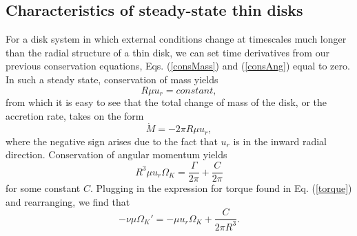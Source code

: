 \documentclass[aps,pra,twocolumn]{revtex4-1}
\begin{document}
\subsection{\label{section 2.2} Characteristics of steady-state thin disks}
For a disk system in which external conditions change at timescales much longer than the radial structure of a thin disk, we can set time derivatives from our previous conservation equations, Eqs. (\ref{consMass}) and (\ref{consAng}) equal to zero.  In such a steady state, conservation of mass yields
\begin{equation}
R\mu u_r = constant, \nonumber
\end{equation}
from which it is easy to see that the total change of mass of the disk, or the accretion rate, takes on the form
\begin{equation}
\dot{M} = -2\pi R \mu u_r, \label{modifiedMass1}
\end{equation}
where the negative sign arises due to the fact that $u_r$ is in the inward radial direction.  Conservation of angular momentum yields
\begin{equation}
R^3 \mu u_r \Omega_K = \frac{\Gamma}{2\pi} + \frac{C}{2\pi} \nonumber
\end{equation}
for some constant $C$.  Plugging in the expression for torque found in Eq. (\ref{torque}) and rearranging, we find that \cite{king2002}
\begin{equation}
- \nu \mu \Omega_K' = -\mu u_r \Omega_K  + \frac{C}{2\pi R^3 }. \label{modifiedAng1}
\end{equation}
\end{document}

